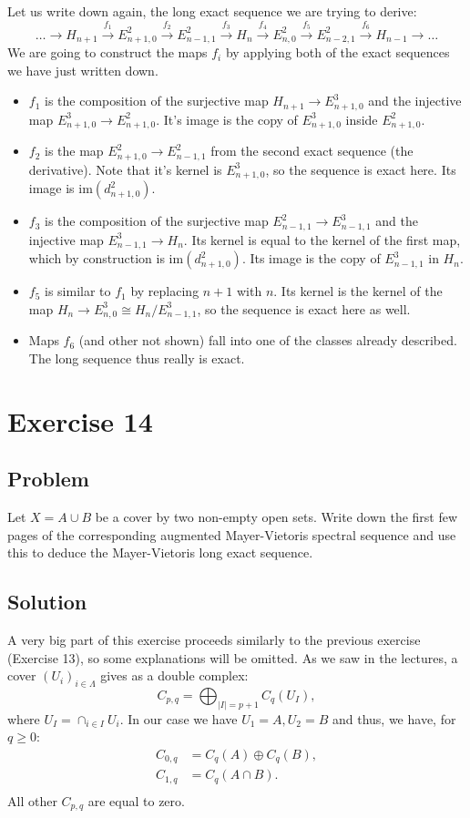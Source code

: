 \documentclass{article}
\begin{document}
Let us write down again, the long exact sequence we are trying to derive:
\begin{equation*}
\dots \to H_{n+1} \xrightarrow{f_1} E^2_{n+1,0} \xrightarrow{f_2}  E^2_{n-1,1} \xrightarrow{f_3}  H_n \xrightarrow{f_4}  E^2_{n,0} \xrightarrow{f_5}  E^2_{n-2,1} \xrightarrow{f_6}  H_{n-1} \to \dots
\end{equation*}
We are going to construct the maps $f_i$ by applying both of the exact sequences we have just written down.
\begin{itemize}
\item $f_1$ is the composition of the surjective map $H_{n+1} \to E_{n+1,0}^3$ and the injective map $E^3_{n+1,0} \to E^2_{n+1,0}$. It's image is the copy of $E^3_{n+1,0}$ inside $E^2_{n+1,0}$.
\item $f_2$ is the map $E^2_{n+1,0} \to E^2_{n-1,1}$ from the second exact sequence (the derivative). Note that it's kernel is $E^3_{n+1,0}$, so the sequence is exact here. Its image is $\mathrm{im}(d^2_{n+1,0})$.
\item $f_3$ is the composition of the surjective map $E^2_{n-1,1} \to E^3_{n-1,1}$ and the injective map $E^3_{n-1,1} \to H_n$. Its kernel is equal to the kernel of the first map, which by construction is $\mathrm{im}(d^2_{n+1,0})$. Its image is the copy of $E^3_{n-1,1}$ in $H_n$.
\item $f_5$ is similar to $f_1$ by replacing $n+1$ with $n$. Its kernel is the kernel of the map $H_n \to E_{n,0}^3 \cong H_n/E^3_{n-1,1}$, so the sequence is exact here as well.
\item Maps $f_6$ (and other not shown) fall into one of the classes already described. The long sequence thus really is exact. 
\end{itemize}
\newpage
\section*{Exercise 14}
\subsection*{Problem}
Let $X = A \cup B$ be a cover by two non-empty open sets. Write down the first few pages of the
corresponding augmented Mayer-Vietoris spectral sequence and use this to deduce the Mayer-Vietoris long exact sequence. 
\subsection*{Solution}
A very big part of this exercise proceeds similarly to the previous exercise (Exercise 13), so some explanations will be omitted.
As we saw in the lectures, a cover $(U_i)_{i \in \Lambda}$ gives as a double complex:
\begin{equation*}
C_{p,q} = \bigoplus_{|I| = p+1} C_q (U_I),
\end{equation*}
where $U_I = \cap_{i \in I} U_i$. In our case we have $U_1 = A, U_2 = B$ and thus, we have, for $q \geq 0$:
\begin{align*}
C_{0,q} &= C_q(A) \oplus C_q(B), \\
C_{1,q} &= C_q(A \cap B). \\
\end{align*}
All other $C_{p,q}$ are equal to zero.
\end{document}
